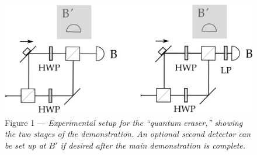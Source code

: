 \begin{figure}[h]
  \begin{center}
    \includegraphics[width=4.53in,height=1.99in]{images/15_quantum-eraser/complete.png}
    \captionsetup{width=.75\textwidth}
    \caption*{Figure 1 --- \emph{Experimental setup for the ``quantum eraser,'' showing the two stages of the 
    demonstration. An optional second detector can be set up at $B'$ if desired after the main demonstration is complete.}}
  \end{center}
\end{figure}
